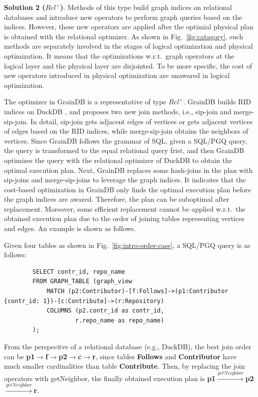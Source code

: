 {\textbf{Solution 2 ($Rel^+$)}.
Methods of this type build graph indices on relational databases and introduce new operators to perform graph queries based on the indices.
However, these new operators are applied after the optimial physical plan is obtained with the relational optimizer.
As shown in Fig.~\ref{fig:catagory}, such methods are separately involved in the stages of logical optimization and physical optimization.
It means that the optimizations w.r.t.~graph operators at the logical layer and the physical layer are disjointed.
To be more specific, the cost of new operators introduced in physical optimization are unawared in logical optimization.

The optimizer in GrainDB \cite{graindb} is a representative of type $Rel^+$.
GrainDB builds RID indices on DuckDB \cite{duckdb}, and proposes two new join methods, i.e., sip-join and merge-sip-join.
In detail, sip-join gets adjacent edges of vertices or gets adjacent vertices of edges based on the RID indices, while merge-sip-join obtains the neighbors of vertices.
Since GrainDB follows the grammar of SQL, given a SQL/PGQ query, the query is transformed to the equal relational query frist, and then GrainDB optimizes the query with the relational optimizer of DuckDB to obtain the optimal execution plan.
Next, GrainDB replaces some hash-joins in the plan with sip-joins and merge-sip-joins to leverage the graph indices.
It indicates that the cost-based optimization in GrainDB only finds the optimal execution plan before the graph indices are awared.
Therefore, the plan can be suboptimal after replacement.
Moreover, some efficient replacement cannot be applied w.r.t.~the obtained execution plan due to the order of joining tables representing vertices and edges.
An example is shown as follows.

\begin{example}
    Given four tables as shown in Fig.~\ref{fig:intro-order-case}, a SQL/PGQ query is as follows:
    \begin{lstlisting}
        SELECT contr_id, repo_name
        FROM GRAPH_TABLE (graph_view
            MATCH (p2:Contributor)-[f:Follows]->(p1:Contributor {contr_id: 1})-[c:Contribute]->(r:Repository)
            COLUMNS (p2.contr_id as contr_id,
                    r.repo_name as repo_name)
        );
    \end{lstlisting}
    From the perspecitve of a relational database (e.g., DuckDB), the best join order can be \textbf{p1$\rightarrow$f$\rightarrow$p2$\rightarrow$c$\rightarrow$r}, since tables \textbf{Follows} and \textbf{Contributor} have much smaller cardinalities than table \textbf{Contribute}.
    Then, by replacing the join operators with getNeighbor, the finally obtained execution plan is \textbf{p1$\xrightarrow{\textit{getNeighbor}}$p2$\xrightarrow{\textit{getNeighbor}}$r}.


\end{example}}
